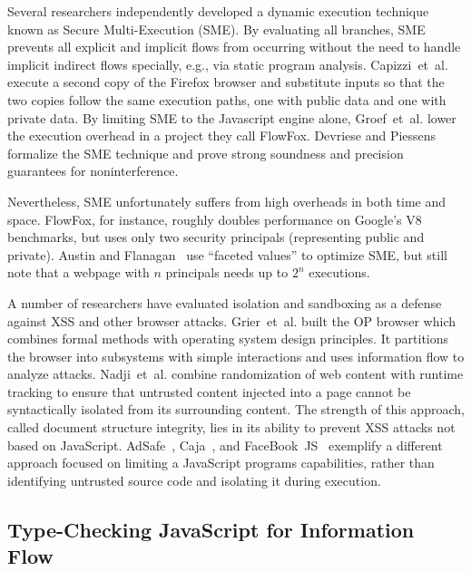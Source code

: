 Several researchers independently developed a dynamic execution technique known as Secure Multi-Execution (SME).
By evaluating all branches, SME prevents all explicit and implicit flows from occurring without the need to handle implicit indirect flows specially, e.g., via static program analysis.
Capizzi~et~al.\cite{capizzi.etal+08} execute a second copy of the Firefox browser and substitute inputs so that the two copies follow the same execution paths, one with public data and one with private data.
By limiting SME to the Javascript engine alone, Groef~et~al.\cite{groef.etal+12} lower the execution overhead in a project they call FlowFox.
Devriese and Piessens~\cite{devriese.piessens+10} formalize the SME technique and prove strong soundness and precision guarantees for noninterference.

Nevertheless, SME unfortunately suffers from high overheads in both time and space.
FlowFox, for instance, roughly doubles performance on Google's V8 benchmarks, but uses only two security principals (representing public and private).
Austin and Flanagan~\cite{austin.flanagan+12} use ``faceted values'' to optimize SME, but still note that a webpage with $n$ principals needs up to $2^n$ executions.

A number of researchers have evaluated isolation and sandboxing as a defense against XSS and other browser attacks.
Grier~et~al.\cite{grier.etal+08} built the OP browser which combines formal methods with operating system design principles.
It partitions the browser into subsystems with simple interactions and uses information flow to analyze attacks.
Nadji~et~al.\cite{nadji.etal+09} combine randomization of web content with runtime tracking to ensure that untrusted content injected into a page cannot be syntactically isolated from its surrounding content.
The strength of this approach, called document structure integrity, lies in its ability to prevent XSS attacks not based on JavaScript.
AdSafe~\cite{adsafe}, Caja~\cite{caja}, and FaceBook~JS~\cite{facebookjs} exemplify a different approach focused on limiting a JavaScript programs capabilities, rather than identifying untrusted source code and isolating it during execution.

\subsection{Type-Checking JavaScript for Information Flow}

